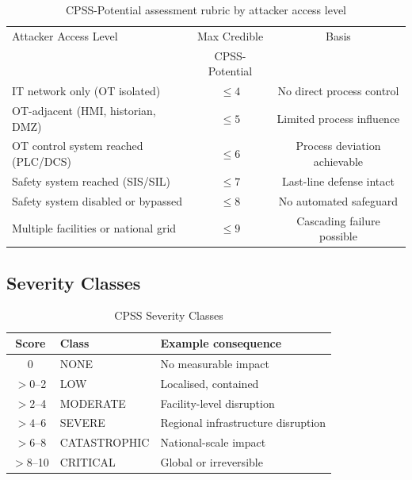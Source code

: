\documentclass[11pt]{article}
\begin{document}
\begin{table}[htbp]
\centering
\caption{CPSS-Potential assessment rubric by attacker access level}
\label{tab:potential_rubric}
\begin{tabular}{lcc}
\toprule
Attacker Access Level & Max Credible & Basis \\
                      & CPSS-Potential & \\
\midrule
IT network only (OT isolated)              & $\leq 4$ & No direct process control \\
OT-adjacent (HMI, historian, DMZ)          & $\leq 5$ & Limited process influence \\
OT control system reached (PLC/DCS)        & $\leq 6$ & Process deviation achievable \\
Safety system reached (SIS/SIL)            & $\leq 7$ & Last-line defense intact \\
Safety system disabled or bypassed         & $\leq 8$ & No automated safeguard \\
Multiple facilities or national grid       & $\leq 9$ & Cascading failure possible \\
\bottomrule
\end{tabular}
\end{table}

\subsection{Severity Classes}

\begin{table}[htbp]
\centering
\caption{CPSS Severity Classes}
\label{tab:class}
\begin{tabular}{cll}
\toprule
Score & Class & Example consequence \\
\midrule
0         & NONE         & No measurable impact \\
$>0$--2   & LOW          & Localised, contained \\
$>2$--4   & MODERATE     & Facility-level disruption \\
$>4$--6   & SEVERE       & Regional infrastructure disruption \\
$>6$--8   & CATASTROPHIC & National-scale impact \\
$>8$--10  & CRITICAL     & Global or irreversible \\
\bottomrule
\end{tabular}
\end{table}

\end{document}
